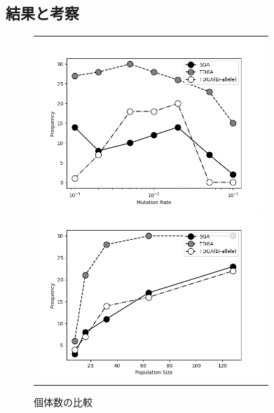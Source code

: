 \documentclass[dvipdfmx,autodetect-engine]{ujarticle}
\begin{document}
	\subsection{結果と考察}
	\begin{figure}[htbp]
	  \begin{center}
	    \begin{tabular}{c}

	      \begin{minipage}{0.50\hsize}
	        \begin{center}
						\includegraphics[width=8.5cm]{./fig/mutation_rate.png}
						\caption{突然変異率の比較}
						\label{fig:mutation_rate}
	        \end{center}
	      \end{minipage}

	      \begin{minipage}{0.50\hsize}
	        \begin{center}
						\includegraphics[width=8.5cm]{./fig/population_size.png}
						\caption{個体数の比較}
						\label{fig:population_size}
	        \end{center}
	      \end{minipage}

	    \end{tabular}
	  \end{center}
	\end{figure}
\end{document}
